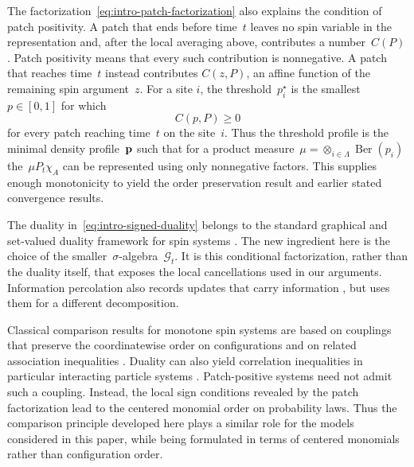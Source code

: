 \documentclass[EJP,preprint,NODS,nobera]{ejpecp}
\begin{document}
The factorization~\eqref{eq:intro-patch-factorization} also explains the
condition of patch positivity. A patch that ends before time~$t$ leaves no
spin variable in the representation and, after the local averaging above,
contributes a number~$C(P)$. Patch positivity means that every such
contribution is nonnegative. A patch that reaches time~$t$ instead contributes
$C(z,P)$, an affine function of the remaining spin argument~$z$. For a site
$i$, the threshold~$p_i^\star$ is the smallest~$p\in[0,1]$ for which
\begin{equation*}
C(p,P)\geq0
\end{equation*}
for every patch reaching time~$t$ on the site~$i$. Thus the threshold profile
is the minimal density profile~$\mathbf{p}$ such that for a product measure~$\mu = \otimes_{i\in\Lambda}\operatorname{Ber}(p_i)$ the~$\mu P_t \chi_A$ can be represented using only nonnegative factors. This supplies enough monotonicity to yield the order preservation result and earlier stated convergence results.

The duality in~\eqref{eq:intro-signed-duality} belongs to the standard
graphical and set-valued duality framework for spin systems
\cite{Harris1974,Harris1978,Griffeath1979,HolleyStroock1979,Gray1986,JansenKurt2014}.
The new ingredient here is the choice of the smaller~$\sigma$-algebra~$\mathcal G_t$.
It is this conditional factorization, rather than the duality itself, that
exposes the local cancellations used in our arguments. Information
percolation also records updates that carry information
\cite{LubetzkySly2016}, but uses them for a different decomposition.

Classical comparison results for monotone spin systems are based on couplings
that preserve the coordinatewise order on configurations and on related
association inequalities
\cite{Harris1977,Liggett1985,Liggett2006}. Duality can also yield correlation
inequalities in particular interacting particle systems
\cite{GiardinaRedigVafayi2010}. Patch-positive systems need not admit such a
coupling. Instead, the local sign conditions revealed by the patch
factorization lead to the centered monomial order on probability laws. Thus
the comparison principle developed here plays a similar role for the models
considered in this paper, while being formulated in terms of centered
monomials rather than configuration order.
\end{document}
